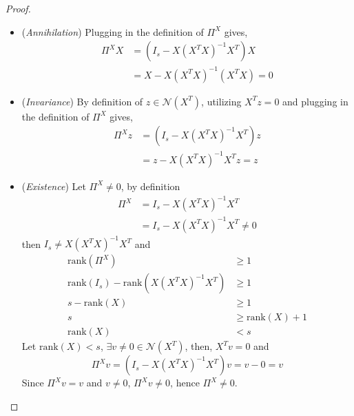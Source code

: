     \begin{proof}
        \begin{itemize}
        \item (\textit{Annihilation}) 
        Plugging in the definition of $\Pi^X$ gives,
        \begin{equation*}
        \begin{split}
            \Pi^X X&=(I_s-X{(X^T X)}^{-1}X^T) X\\
            &=X-X{(X^T X)}^{-1}{(X^T X)}=0
        \end{split}
        \end{equation*}
        \item (\textit{Invariance})
        By definition of $z\in\mathcal{N}(X^T)$, utilizing $X^T z=0$ and plugging in the definition of $\Pi^X$ gives,
        \begin{equation*}
        \begin{split}
            \Pi^X z&=(I_s-X{(X^T X)}^{-1}X^T) z\\
            &=z-X{(X^T X)}^{-1}X^T z=z
        \end{split}
        \end{equation*}
        \item (\textit{Existence})
        Let $\Pi^X\neq 0$, by definition 
        \begin{equation*}
        \begin{split}
            \Pi^X &=I_s-X{(X^T X)}^{-1}X^T \\
            &=I_s-X{(X^T X)}^{-1}X^T\neq 0
        \end{split}
        \end{equation*}
        then $I_s\neq X{(X^T X)}^{-1}X^T$ and 
        \begin{equation*}
        \begin{split}
            \mathrm{rank}(\Pi^X) &\geq 1 \\
            \mathrm{rank}(I_s)-\mathrm{rank}(X{(X^T X)}^{-1}X^T)&\geq 1 \\
            s-\mathrm{rank}(X)&\geq 1\\
            s&\geq \mathrm{rank}(X)+1\\
            \mathrm{rank}(X)&<s
        \end{split}
        \end{equation*}
        Let $\mathrm{rank}(X)<s$, $\exists v\neq 0\in\mathcal{N}(X^T)$, then, $X^T v=0$ and
        \begin{equation*}
            \Pi^X v=(I_s-X{(X^T X)}^{-1}X^T)v=v-0=v
        \end{equation*}
        Since $\Pi^X v=v$ and $v\neq 0$, $\Pi^X v\neq 0$, hence $\Pi^X\neq 0$.
    \end{itemize}
\end{proof}


